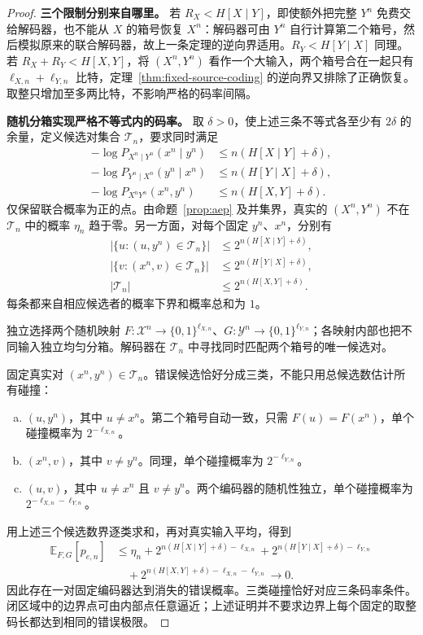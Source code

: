 \documentclass[lang=cn,a4paper,fontset=none,zihao=false,10pt,openany,twoside]{beautybook}
\numberwithin{algorithm}{chapter}
\begin{document}
\begin{proof}
\textbf{三个限制分别来自哪里。} 若 $R_X<H[X\mid Y]$，即使额外把完整 $Y^n$ 免费交给解码器，也不能从 $X$ 的箱号恢复 $X^n$：解码器可由 $Y^n$ 自行计算第二个箱号，然后模拟原来的联合解码器，故上一条定理的逆向界适用。$R_Y<H[Y\mid X]$ 同理。若 $R_X+R_Y<H[X,Y]$，将 $(X^n,Y^n)$ 看作一个大输入，两个箱号合在一起只有 $\ell_{X,n}+\ell_{Y,n}$ 比特，定理~\ref{thm:fixed-source-coding} 的逆向界又排除了正确恢复。取整只增加至多两比特，不影响严格的码率间隔。

\textbf{随机分箱实现严格不等式内的码率。} 取 $\delta>0$，使上述三条不等式各至少有 $2\delta$ 的余量，定义候选对集合 $\mathcal T_n$，要求同时满足
\[
 \begin{aligned}
 -\log P_{X^n\mid Y^n}(x^n\mid y^n)&\le n(H[X\mid Y]+\delta),\\
 -\log P_{Y^n\mid X^n}(y^n\mid x^n)&\le n(H[Y\mid X]+\delta),\\
 -\log P_{X^nY^n}(x^n,y^n)&\le n(H[X,Y]+\delta).
 \end{aligned}
\]
仅保留联合概率为正的点。由命题~\ref{prop:aep} 及并集界，真实的 $(X^n,Y^n)$ 不在 $\mathcal T_n$ 中的概率 $\eta_n$ 趋于零。另一方面，对每个固定 $y^n$、$x^n$，分别有
\[
 \begin{aligned}
 |\{u:(u,y^n)\in\mathcal T_n\}|&\le2^{n(H[X\mid Y]+\delta)},\\
 |\{v:(x^n,v)\in\mathcal T_n\}|&\le2^{n(H[Y\mid X]+\delta)},\\
 |\mathcal T_n|&\le2^{n(H[X,Y]+\delta)}.
 \end{aligned}
\]
每条都来自相应候选者的概率下界和概率总和为 $1$。

独立选择两个随机映射 $F:\mathcal X^n\to\{0,1\}^{\ell_{X,n}}$、$G:\mathcal Y^n\to\{0,1\}^{\ell_{Y,n}}$；各映射内部也把不同输入独立均匀分箱。解码器在 $\mathcal T_n$ 中寻找同时匹配两个箱号的唯一候选对。

固定真实对 $(x^n,y^n)\in\mathcal T_n$。错误候选恰好分成三类，不能只用总候选数估计所有碰撞：
\begin{enumerate}[(a)]
\item $(u,y^n)$，其中 $u\ne x^n$。第二个箱号自动一致，只需 $F(u)=F(x^n)$，单个碰撞概率为 $2^{-\ell_{X,n}}$。
\item $(x^n,v)$，其中 $v\ne y^n$。同理，单个碰撞概率为 $2^{-\ell_{Y,n}}$。
\item $(u,v)$，其中 $u\ne x^n$ 且 $v\ne y^n$。两个编码器的随机性独立，单个碰撞概率为 $2^{-\ell_{X,n}-\ell_{Y,n}}$。
\end{enumerate}
用上述三个候选数界逐类求和，再对真实输入平均，得到
\[
 \begin{aligned}
 \mathbb E_{F,G}[p_{e,n}]
 &\le\eta_n+2^{n(H[X\mid Y]+\delta)-\ell_{X,n}}
       +2^{n(H[Y\mid X]+\delta)-\ell_{Y,n}}\\
 &\quad+2^{n(H[X,Y]+\delta)-\ell_{X,n}-\ell_{Y,n}}\to0.
 \end{aligned}
\]
因此存在一对固定编码器达到消失的错误概率。三类碰撞恰好对应三条码率条件。闭区域中的边界点可由内部点任意逼近；上述证明并不要求边界上每个固定的取整码长都达到相同的错误极限。
\end{proof}
\end{document}
